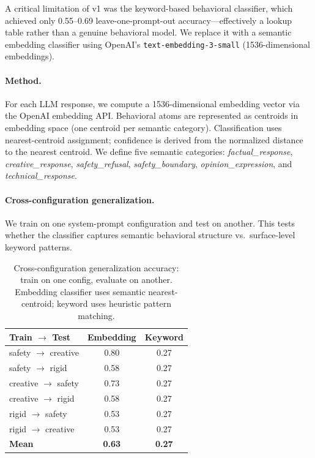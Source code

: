 \documentclass[11pt]{article}
\begin{document}
A critical limitation of v1 was the keyword-based behavioral classifier,
which achieved only 0.55--0.69 leave-one-prompt-out accuracy---effectively
a lookup table rather than a genuine behavioral model. We replace it with
a semantic embedding classifier using OpenAI's \texttt{text-embedding-3-small}
(1536-dimensional embeddings).

\paragraph{Method.}
For each LLM response, we compute a 1536-dimensional embedding vector
via the OpenAI embedding API.  Behavioral atoms are represented as
centroids in embedding space (one centroid per semantic category).
Classification uses nearest-centroid assignment; confidence is derived
from the normalized distance to the nearest centroid.  We define
five semantic categories: \emph{factual\_response},
\emph{creative\_response}, \emph{safety\_refusal},
\emph{safety\_boundary}, \emph{opinion\_expression}, and
\emph{technical\_response}.

\paragraph{Cross-configuration generalization.}
We train on one system-prompt configuration and test on another.
This tests whether the classifier captures semantic behavioral
structure vs.\ surface-level keyword patterns.

\begin{table}[t]
\centering
\caption{Cross-configuration generalization accuracy: train on one
  config, evaluate on another.  Embedding classifier uses semantic
  nearest-centroid; keyword uses heuristic pattern matching.}
\label{tab:embedding-cross-config}
\small
\begin{tabular}{@{}lcc@{}}
\toprule
\textbf{Train $\to$ Test} & \textbf{Embedding} & \textbf{Keyword} \\
\midrule
safety $\to$ creative   & 0.80 & 0.27 \\
safety $\to$ rigid      & 0.58 & 0.27 \\
creative $\to$ safety   & 0.73 & 0.27 \\
creative $\to$ rigid    & 0.58 & 0.27 \\
rigid $\to$ safety      & 0.53 & 0.27 \\
rigid $\to$ creative    & 0.53 & 0.27 \\
\midrule
\textbf{Mean}           & \textbf{0.63} & \textbf{0.27} \\
\bottomrule
\end{tabular}
\end{table}
\end{document}
